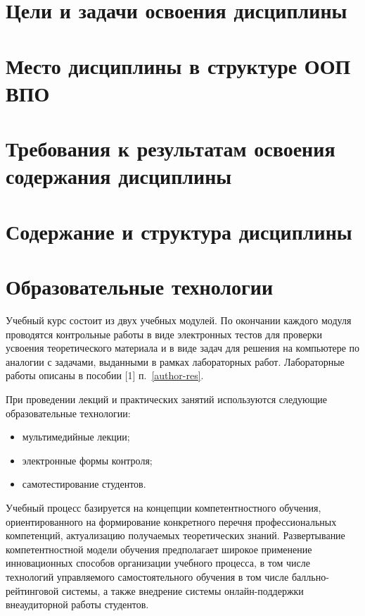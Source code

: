 






\section{Цели и задачи освоения дисциплины}


\section{Место дисциплины в структуре ООП ВПО}


\section{Требования к результатам освоения содержания дисциплины}


\section{Содержание и структура дисциплины}


\section{Образовательные технологии}

Учебный курс состоит из двух учебных модулей. По окончании каждого модуля проводятся контрольные работы в виде электронных тестов для проверки усвоения теоретического материала и в виде задач для решения на компьютере по аналогии с задачами, выданными в рамках лабораторных работ. Лабораторные работы описаны в пособии [1] п.~\ref{author-res}.

При проведении лекций и практических занятий используются следующие образовательные технологии:
\begin{itemize}
	\item мультимедийные лекции;
	\item электронные формы контроля;
	\item самотестирование студентов.
\end{itemize}

Учебный процесс базируется на концепции компетентностного обучения, ориентированного на формирование конкретного перечня профессиональных компетенций, актуализацию получаемых теоретических знаний. Развертывание компетентностной модели обучения предполагает широкое применение инновационных способов организации учебного процесса, в том числе технологий управляемого самостоятельного обучения в том числе балльно-рейтинговой системы, а также внедрение системы онлайн-поддержки внеаудиторной работы студентов.

